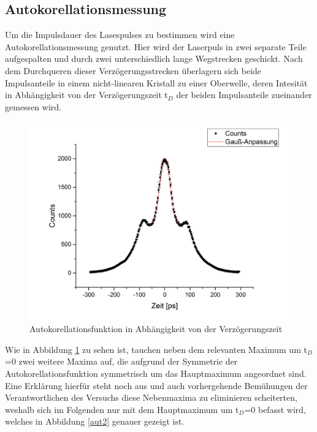 \subsection{Autokorellationsmessung}
Um die Impulsdauer des Lasespulses zu bestimmen wird eine Autokorellationsmessung genutzt. Hier wird der Laserpuls in zwei separate Teile aufgespalten und durch zwei unterschiedlich lange Wegstrecken geschickt. Nach dem Durchqueren dieser Verzögerungsstrecken überlagern sich beide Impulsanteile in einem nicht-linearen Kristall zu einer Oberwelle, deren Intesität in Abhängigkeit von der Verzögerungszeit t$_D$ der beiden Impulsanteile zueinander gemessen wird. 
\begin{figure}[H]
	\begin{center}
		\includegraphics[scale=.5]{Bilder/Autokorr1.png}
		\caption{Autokorellationsfunktion in Abhängigkeit von der Verzögerungszeit}
		\label{aut1}
	\end{center}
\end{figure}
Wie in Abbildung \ref{aut1} zu sehen ist, tauchen neben dem relevanten Maximum um t$_D$=0 zwei weitere Maxima auf, die aufgrund der Symmetrie der Autokorellationsfunktion symmetrisch um das Hauptmaximum angeordnet sind. Eine Erklärung hierfür steht noch aus und auch vorhergehende Bemühungen der Verantwortlichen des Versuchs diese Nebenmaxima zu eliminieren scheiterten, weshalb sich im Folgenden nur mit dem Hauptmaximum um t$_D$=0 befasst wird, welches in Abbildung \ref{aut2} genauer gezeigt ist.
